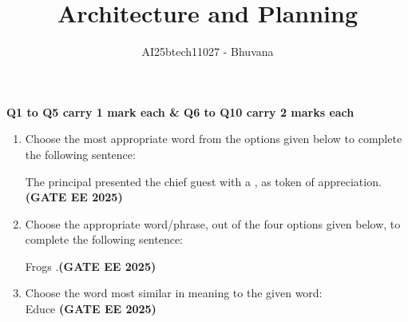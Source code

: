 \documentclass[journal,12pt,onecolumn]{IEEEtran}
\theoremstyle{remark}
\begin{document}
\title{Architecture and Planning}
\author{AI25btech11027 - Bhuvana}
\maketitle
\renewcommand{\thefigure}{\theenumi}
\renewcommand{\thetable}{\theenumi}
\begin {center}
\textbf{Q1 to Q5 carry 1 mark each \&  Q6 to Q10 carry 2 marks each}

\end{center}

\begin{enumerate}


\item Choose the most appropriate word from the options given below to complete the following sentence:  

The principal presented the chief guest with a \underline{\makebox[2cm]{\hfill}}, as token of appreciation.\hfill \textbf{(GATE EE 2025)}
\begin{enumerate}
\end{enumerate}


\item Choose the appropriate word/phrase, out of the four options given below, to complete the following sentence:  

Frogs \underline{\makebox[2cm]{\hfill}}.\hfill \textbf{(GATE EE 2025)}
\begin{enumerate}
\end{enumerate}


\item Choose the word most similar in meaning to the given word:  \\
Educe \hfill \textbf{(GATE EE 2025)}
\begin{enumerate}
\end{enumerate}



\end{enumerate}
\end{document}
